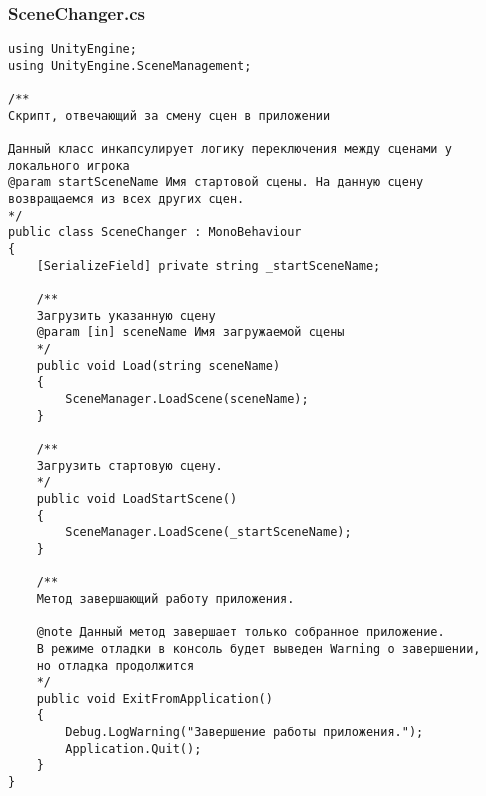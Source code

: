 \subsubsection*{SceneChanger.cs}
\begin{verbatim}
﻿using UnityEngine;
using UnityEngine.SceneManagement;

/**
Скрипт, отвечающий за смену сцен в приложении

Данный класс инкапсулирует логику переключения между сценами у локального игрока
@param startSceneName Имя стартовой сцены. На данную сцену возвращаемся из всех других сцен.
*/
public class SceneChanger : MonoBehaviour
{
    [SerializeField] private string _startSceneName;

    /**
    Загрузить указанную сцену
    @param [in] sceneName Имя загружаемой сцены
    */
    public void Load(string sceneName)
    {
        SceneManager.LoadScene(sceneName);
    }

    /**
    Загрузить стартовую сцену.
    */
    public void LoadStartScene()
    {
        SceneManager.LoadScene(_startSceneName);
    }

    /**
    Метод завершающий работу приложения.

    @note Данный метод завершает только собранное приложение. 
    В режиме отладки в консоль будет выведен Warning о завершении, 
    но отладка продолжится
    */
    public void ExitFromApplication()
    {
        Debug.LogWarning("Завершение работы приложения.");
        Application.Quit();
    }
}

\end{verbatim}
